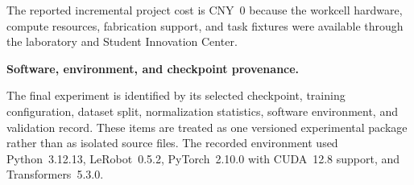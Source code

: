 The reported incremental project cost is CNY~0 because the workcell hardware,
compute resources, fabrication support, and task fixtures were available
through the laboratory and Student Innovation Center.

\medskip
\noindent\textbf{Software, environment, and checkpoint provenance.}

The final experiment is identified by its selected checkpoint, training
configuration, dataset split, normalization statistics, software environment,
and validation record. These items are treated as one versioned experimental
package rather than as isolated source files. The recorded environment used
Python~3.12.13, LeRobot~0.5.2, PyTorch~2.10.0 with CUDA~12.8 support, and
Transformers~5.3.0.

\setlength{\emergencystretch}{0pt}
